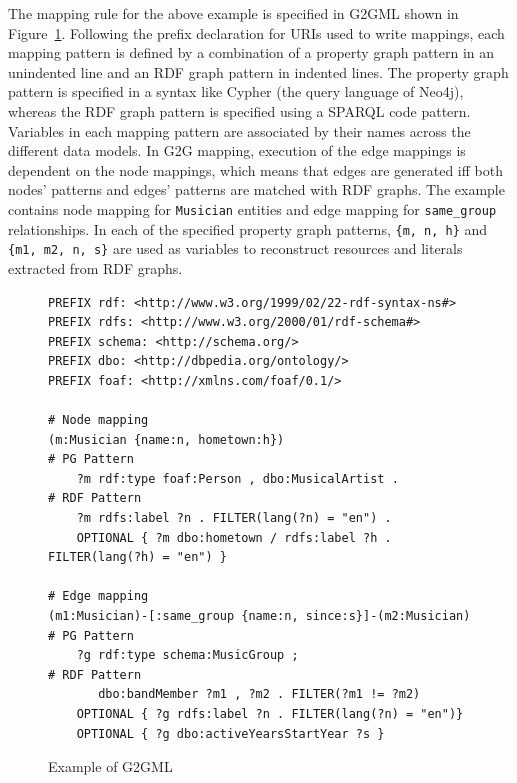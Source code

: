 \documentclass[runningheads]{llncs}
\begin{document}
The mapping rule for the above example is specified in G2GML shown in Figure~\ref{fig:g2gml}. Following the prefix declaration for URIs used to write mappings, each mapping pattern is defined by a combination of a property graph pattern in an unindented line and an RDF graph pattern in indented lines. The property graph pattern is specified in a syntax like Cypher (the query language of Neo4j), whereas the RDF graph pattern is specified using a SPARQL code pattern. 
Variables in each mapping pattern are associated by their names across the different data models. 
In G2G mapping, execution of the edge mappings is dependent on the node mappings, which means that edges are generated iff both nodes' patterns and edges' patterns are matched with RDF graphs. 
The example contains node mapping for \texttt{Musician} entities and edge mapping for \texttt{same\_group} relationships.
In each of the specified property graph patterns, \texttt{\{m, n, h\}} and \texttt{\{m1, m2, n, s\}} are used as variables to reconstruct resources and literals extracted from RDF graphs. 

\begin{figure}[!t]
\vspace{2mm}
\begin{scriptsize}
\begin{verbatim}
PREFIX rdf: <http://www.w3.org/1999/02/22-rdf-syntax-ns#>
PREFIX rdfs: <http://www.w3.org/2000/01/rdf-schema#>
PREFIX schema: <http://schema.org/>
PREFIX dbo: <http://dbpedia.org/ontology/>
PREFIX foaf: <http://xmlns.com/foaf/0.1/>

# Node mapping
(m:Musician {name:n, hometown:h})                            # PG Pattern
    ?m rdf:type foaf:Person , dbo:MusicalArtist .            # RDF Pattern
    ?m rdfs:label ?n . FILTER(lang(?n) = "en") .
    OPTIONAL { ?m dbo:hometown / rdfs:label ?h . FILTER(lang(?h) = "en") }

# Edge mapping
(m1:Musician)-[:same_group {name:n, since:s}]-(m2:Musician)  # PG Pattern
    ?g rdf:type schema:MusicGroup ;                          # RDF Pattern
       dbo:bandMember ?m1 , ?m2 . FILTER(?m1 != ?m2)
    OPTIONAL { ?g rdfs:label ?n . FILTER(lang(?n) = "en")}
    OPTIONAL { ?g dbo:activeYearsStartYear ?s }
\end{verbatim}
\end{scriptsize}
\caption{Example of G2GML}
\label{fig:g2gml}
\end{figure}
\end{document}
